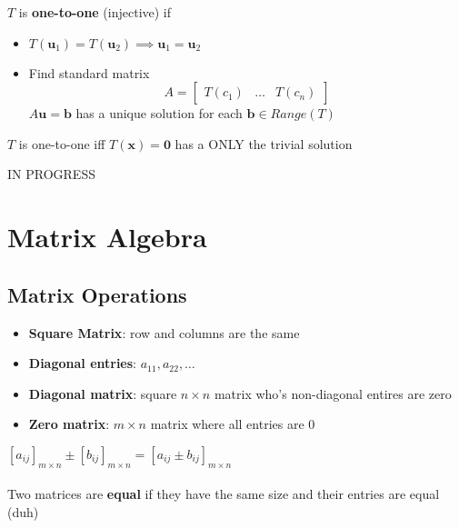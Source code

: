 \documentclass{report}
\begin{document}
\begin{definition}
\end{definition}
$T$ is \textbf{one-to-one} (injective) if
\begin{itemize}
    \item $T(\mathbf{u}_1) = T(\mathbf{u}_2) \implies \mathbf{u}_1 = \mathbf{u}_2$
    \item Find standard matrix 
    \[
    A = \begin{bmatrix}
        T(c_1) & \ldots & T(c_n)
    \end{bmatrix}
    \]
    $A \mathbf{u} = \mathbf{b}$ has a unique solution for each $\mathbf{b} \in Range(T)$
\end{itemize}

\begin{theorem}
\end{theorem}
$T$ is one-to-one iff $T(\mathbf{x}) = \mathbf{0}$ has a ONLY the trivial solution

IN PROGRESS

\chapter{Matrix Algebra}

\section{Matrix Operations}
\begin{itemize}
    \item \textbf{Square Matrix}: row and columns are the same
    \item \textbf{Diagonal entries}: $a_{11}, a_{22}, \ldots$
    \item \textbf{Diagonal matrix}: square $n \times n$ matrix who's non-diagonal entires are zero
    \item \textbf{Zero matrix}: $m \times n$ matrix where all entries are 0
\end{itemize}

$\left[ a_{ij} \right]_{m \times n} \pm \left[ b_{ij} \right]_{m \times n} = \left[ a_{ij} \pm b_{ij} \right]_{m \times n}$
\\\\
Two matrices are \textbf{equal} if they have the same size and their entries are equal (duh)
\end{document}

